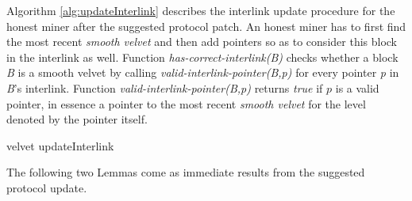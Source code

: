 Algorithm \ref{alg:updateInterlink} describes the interlink update procedure for the
honest miner after the suggested protocol patch. An honest miner has to first find the
most recent \emph{smooth velvet} and then add pointers so as to consider this block in
the interlink as well. Function \textit{has-correct-interlink(B)} checks whether a
block \textit{B} is a smooth velvet by calling \textit{valid-interlink-pointer(B,p)}
for every pointer \textit{p} in \textit{B}'s interlink. Function
\textit{valid-interlink-pointer(B,p)} returns \emph{true} if $p$ is a valid 
pointer, in essence a pointer to the most recent \emph{smooth velvet}
for the level denoted by the pointer itself. 

\vspace{4mm}

\begin{algorithm}[H]
		\SetAlgoNoLine
		\DontPrintSemicolon
	\vspace{4mm}

	\vspace{4mm}
 	\caption{velvet updateInterlink}
 	\label{alg:updateInterlink}
\end{algorithm}

\vspace{4mm}

The following two Lemmas come as immediate results from the suggested protocol update.\\

